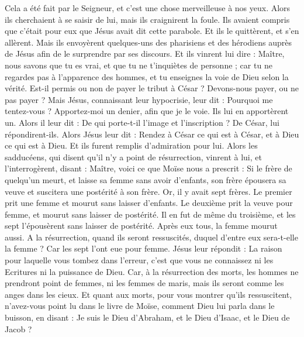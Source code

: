 \begin{multicols}{2}
Cela a été fait par le Seigneur, et c'est une chose merveilleuse à nos yeux.
Alors ils cherchaient à se saisir de lui, mais ils craignirent la foule. Ils avaient compris que c’était pour eux que Jésus avait dit cette parabole. Et ils le quittèrent, et s’en allèrent.
Mais ils envoyèrent quelques-uns des pharisiens et des hérodiens auprès de Jésus afin de le surprendre par ses discours.
Et ils vinrent lui dire : Maître, nous savons que tu es vrai, et que tu ne t’inquiètes de personne ; car tu ne regardes pas à l'apparence des hommes, et tu enseignes la voie de Dieu selon la vérité. Est-il permis ou non de payer le tribut à César ? Devons-nous payer, ou ne pas payer ?
Mais Jésus, connaissant leur hypocrisie, leur dit : Pourquoi me tentez-vous ? Apportez-moi un denier, afin que je le voie.
Ils lui en apportèrent un. Alors il leur dit : De qui porte-t-il l’image et l’inscription ? De César, lui répondirent-ils.
Alors Jésus leur dit : Rendez à César ce qui est à César, et à Dieu ce qui est à Dieu. Et ils furent remplis d’admiration pour lui.
Alors les sadducéens, qui disent qu'il n'y a point de résurrection, vinrent à lui, et l'interrogèrent, disant :
Maître, voici ce que Moïse nous a prescrit : Si le frère de quelqu'un meurt, et laisse sa femme sans avoir d'enfants, son frère épousera sa veuve et suscitera une postérité à son frère.
Or, il y avait sept frères. Le premier prit une femme et mourut sans laisser d'enfants.
Le deuxième prit la veuve pour femme, et mourut sans laisser de postérité. Il en fut de même du troisième,
et les sept l’épousèrent sans laisser de postérité. Après eux tous, la femme mourut aussi.
A la résurrection, quand ils seront ressuscités, duquel d’entre eux sera-t-elle la femme ? Car les sept l’ont eue pour femme.
Jésus leur répondit : La raison pour laquelle vous tombez dans l'erreur, c'est que vous ne connaissez ni les Ecritures ni la puissance de Dieu.
Car, à la résurrection des morts, les hommes ne prendront point de femmes, ni les femmes de maris, mais ils seront comme les anges dans les cieux.
Et quant aux morts, pour vous montrer qu'ils ressuscitent, n'avez-vous point lu dans le livre de Moïse, comment Dieu lui parla dans le buisson, en disant : Je suis le Dieu d'Abraham, et le Dieu d'Isaac, et le Dieu de Jacob ?

\end{multicols}
